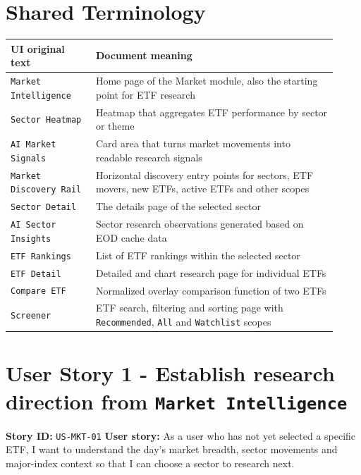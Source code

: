 \section{Shared Terminology}
\begingroup
\small
\begin{longtable}{L{0.24\linewidth}L{0.68\linewidth}}
\toprule
\textbf{UI original text} & \textbf{Document meaning} \\
\midrule
\texttt{Market Intelligence} & Home page of the Market module, also the starting point for ETF research \\
\texttt{Sector Heatmap} & Heatmap that aggregates ETF performance by sector or theme \\
\texttt{AI Market Signals} & Card area that turns market movements into readable research signals \\
\texttt{Market Discovery Rail} & Horizontal discovery entry points for sectors, ETF movers, new ETFs, active ETFs and other scopes \\
\texttt{Sector Detail} & The details page of the selected sector \\
\texttt{AI Sector Insights} & Sector research observations generated based on EOD cache data \\
\texttt{ETF Rankings} & List of ETF rankings within the selected sector \\
\texttt{ETF Detail} & Detailed and chart research page for individual ETFs \\
\texttt{Compare ETF} & Normalized overlay comparison function of two ETFs \\
\texttt{Screener} & ETF search, filtering and sorting page with \texttt{Recommended}, \texttt{All} and \texttt{Watchlist} scopes \\
\bottomrule
\end{longtable}
\endgroup
\prdhr
\hypertarget{us-mkt-01}{}
\section{User Story 1 - Establish research direction from \texttt{Market Intelligence}}
\textbf{Story ID:} \texttt{US-MKT-01}
\textbf{User story:} As a user who has not yet selected a specific ETF, I want to understand the day's market breadth, sector movements and major-index context so that I can choose a sector to research next.
